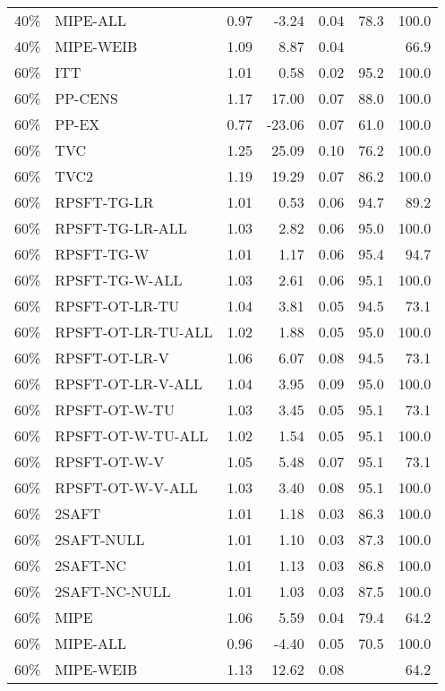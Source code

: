 \begin{table}[ht]
{\begin{tabular}{llrrrrr}
  40\% & MIPE-ALL & 0.97 & -3.24 & 0.04 & 78.3 & 100.0 \\ 
  40\% & MIPE-WEIB & 1.09 & 8.87 & 0.04 &  & 66.9 \\ 
   \hline
60\% & ITT & 1.01 & 0.58 & 0.02 & 95.2 & 100.0 \\ 
  60\% & PP-CENS & 1.17 & 17.00 & 0.07 & 88.0 & 100.0 \\ 
  60\% & PP-EX & 0.77 & -23.06 & 0.07 & 61.0 & 100.0 \\ 
  60\% & TVC & 1.25 & 25.09 & 0.10 & 76.2 & 100.0 \\ 
  60\% & TVC2 & 1.19 & 19.29 & 0.07 & 86.2 & 100.0 \\ 
   \hline
60\% & RPSFT-TG-LR & 1.01 & 0.53 & 0.06 & 94.7 & 89.2 \\ 
  60\% & RPSFT-TG-LR-ALL & 1.03 & 2.82 & 0.06 & 95.0 & 100.0 \\ 
  60\% & RPSFT-TG-W & 1.01 & 1.17 & 0.06 & 95.4 & 94.7 \\ 
  60\% & RPSFT-TG-W-ALL & 1.03 & 2.61 & 0.06 & 95.1 & 100.0 \\ 
  60\% & RPSFT-OT-LR-TU & 1.04 & 3.81 & 0.05 & 94.5 & 73.1 \\ 
  60\% & RPSFT-OT-LR-TU-ALL & 1.02 & 1.88 & 0.05 & 95.0 & 100.0 \\ 
  60\% & RPSFT-OT-LR-V & 1.06 & 6.07 & 0.08 & 94.5 & 73.1 \\ 
  60\% & RPSFT-OT-LR-V-ALL & 1.04 & 3.95 & 0.09 & 95.0 & 100.0 \\ 
   \hline
60\% & RPSFT-OT-W-TU & 1.03 & 3.45 & 0.05 & 95.1 & 73.1 \\ 
  60\% & RPSFT-OT-W-TU-ALL & 1.02 & 1.54 & 0.05 & 95.1 & 100.0 \\ 
  60\% & RPSFT-OT-W-V & 1.05 & 5.48 & 0.07 & 95.1 & 73.1 \\ 
  60\% & RPSFT-OT-W-V-ALL & 1.03 & 3.40 & 0.08 & 95.1 & 100.0 \\ 
   \hline
60\% & 2SAFT & 1.01 & 1.18 & 0.03 & 86.3 & 100.0 \\ 
  60\% & 2SAFT-NULL & 1.01 & 1.10 & 0.03 & 87.3 & 100.0 \\ 
  60\% & 2SAFT-NC & 1.01 & 1.13 & 0.03 & 86.8 & 100.0 \\ 
  60\% & 2SAFT-NC-NULL & 1.01 & 1.03 & 0.03 & 87.5 & 100.0 \\ 
  60\% & MIPE & 1.06 & 5.59 & 0.04 & 79.4 & 64.2 \\ 
  60\% & MIPE-ALL & 0.96 & -4.40 & 0.05 & 70.5 & 100.0 \\ 
  60\% & MIPE-WEIB & 1.13 & 12.62 & 0.08 &  & 64.2 \\ 
   \hline
\end{tabular}
}
\end{table}
